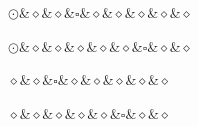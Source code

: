 \begin{exe}
\ex
\label{ex:bouquet diagrams}
\begin{xlist}

\begin{paracol}{2}
\vfill
\ex
\begin{dependency}[theme = simple, baseline=-\the\dimexpr\fontdimen22\textfont2\relax]
    \begin{deptext}
        $\odot$\&$\diamond$\&$\diamond$\&$\square$\&$\diamond$\&$\diamond$\&$\diamond$\&$\diamond$\&$\diamond$\\
    \end{deptext}
\end{dependency}

\switchcolumn

\ex
\begin{dependency}[theme = simple, baseline=-\the\dimexpr\fontdimen22\textfont2\relax]
    \begin{deptext}
        $\odot$\&$\diamond$\&$\diamond$\&$\diamond$\&$\diamond$\&$\diamond$\&$\square$\&$\diamond$\&$\diamond$\\
    \end{deptext}
\end{dependency}
\end{paracol}

\begin{paracol}{2}
\vfill
\ex
\begin{dependency}[theme = simple, baseline=-\the\dimexpr\fontdimen22\textfont2\relax]
    \begin{deptext}
        $\diamond$\&$\diamond$\&$\square$\&$\diamond$\&$\diamond$\&$\diamond$\&$\diamond$\&$\diamond$\\
    \end{deptext}
\end{dependency}

\switchcolumn

\ex
\begin{dependency}[theme = simple, baseline=-\the\dimexpr\fontdimen22\textfont2\relax]
    \begin{deptext}
        $\diamond$\&$\diamond$\&$\diamond$\&$\diamond$\&$\diamond$\&$\square$\&$\diamond$\&$\diamond$\\
    \end{deptext}
\end{dependency}
\end{paracol}


\end{xlist}
\end{exe}
